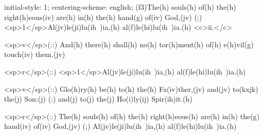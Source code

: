 initial-style: 1;
centering-scheme: english;
(f3)The(h) souls(h) of(h) the(h) right(h)eous(iv) are(h) in(h) the(h) hand(g) of(iv) God,(jv) (;) <sp>1</sp>Al(jv)le(ji)lu(ih~)ia,(h) al(f)le(hi)lu(ih~)ia.(h) <c>ii.</c>

<sp>v</sp>(::) And(h) there(h) shall(h) no(h) tor(h)ment(h) of(h) e(h)vil(g) touch(iv) them.(jv)

<sp>r</sp>(::) <sp>1</sp>Al(jv)le(ji)lu(ih~)ia,(h) al(f)le(hi)lu(ih~)ia.(h)

<sp>v</sp>(::) Glo(h)ry(h) be(h) to(h) the(h) Fa(iv)ther,(jv) and(jv) to(kxjk) the(j) Son:(j) (;) and(j) to(j) the(j) Ho(i)ly(ij) Spir(ih)it.(h)

<sp>r</sp>(::) The(h) souls(h) of(h) the(h) right(h)eous(h) are(h) in(h) the(g) hand(iv) of(iv) God,(jv) (;) Al(jv)le(ji)lu(ih~)ia,(h) al(f)le(hi)lu(ih~)ia.(h)